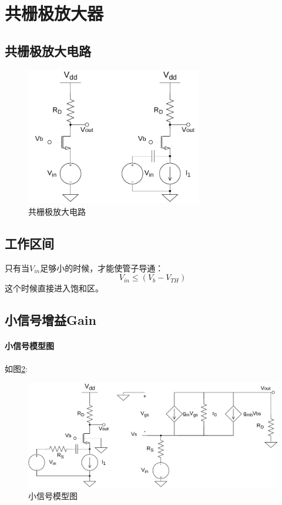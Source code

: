 \documentclass[twoside,a4paper,openright,titlepage,draft]{ctexrep}
\begin{document}
\section{共栅极放大器}
\subsection{共栅极放大电路}
\begin{figure}[H]
    \centering
    \includegraphics[height=60mm]{commongate.drawio.pdf}
    \caption{共栅极放大电路}
    \label{fig:共栅极放大电路}
\end{figure}
\subsection{工作区间}
只有当$V_{in}$足够小的时候，才能使管子导通：
\begin{equation}
    V_{in} \leq (V_b - V_{TH})
\end{equation}
这个时候直接进入饱和区。
\subsection{小信号增益Gain}
\paragraph{小信号模型图}
如图\ref{fig:小信号模型图}:
\begin{figure}[H]
    \centering
    \includegraphics[width=\textwidth]{smallsignal.drawio.pdf}
    \caption{小信号模型图}
    \label{fig:小信号模型图}
\end{figure}
\end{document}
